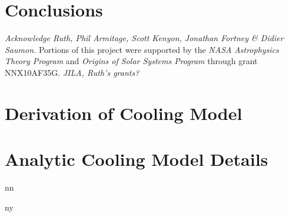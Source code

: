 \documentclass[apj]{emulateapj}
\newcommand\submitms{n}		%
\newcommand\bibinc{n}		%
\newcommand{\emgr}[1]{\emph{ \color{gray} #1}}
\begin{document}
\section{Conclusions}





\acknowledgements
\emgr{Acknowledge Ruth, Phil Armitage, Scott Kenyon, Jonathan Fortney \& Didier Saumon.}  Portions of this project were supported by the {\it NASA} {\it Astrophysics Theory Program} and  {\it Origins of Solar Systems Program}  through grant NNX10AF35G. \emgr{JILA, Ruth's grants?}\\

\appendix
\section{Derivation of Cooling Model}\label{sec:virial}
\section{Analytic Cooling Model Details}\label{sec:analytic}

\if\bibinc n

\fi

\if\bibinc y
\begin{thebibliography}
\end{thebibliography}
\fi
\end{document}
